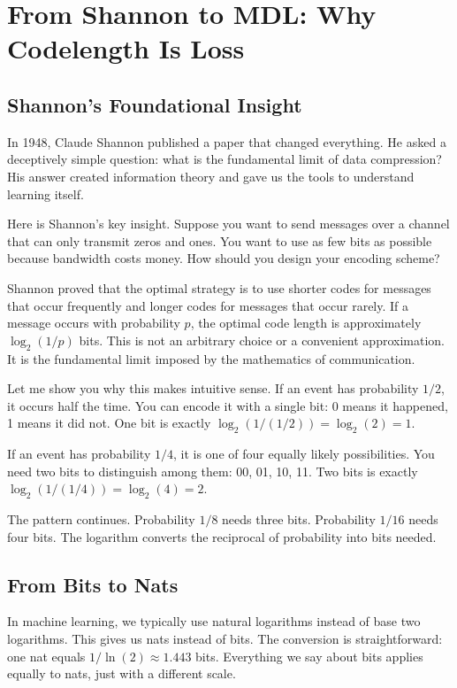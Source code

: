 \vspace{2em}

\section{From Shannon to MDL: Why Codelength Is Loss}

\subsection{Shannon's Foundational Insight}

In 1948, Claude Shannon published a paper that changed everything. He asked a deceptively simple question: what is the fundamental limit of data compression? His answer created information theory and gave us the tools to understand learning itself.

Here is Shannon's key insight. Suppose you want to send messages over a channel that can only transmit zeros and ones. You want to use as few bits as possible because bandwidth costs money. How should you design your encoding scheme?

Shannon proved that the optimal strategy is to use shorter codes for messages that occur frequently and longer codes for messages that occur rarely. If a message occurs with probability $p$, the optimal code length is approximately $\log_2(1/p)$ bits. This is not an arbitrary choice or a convenient approximation. It is the fundamental limit imposed by the mathematics of communication.

Let me show you why this makes intuitive sense. If an event has probability $1/2$, it occurs half the time. You can encode it with a single bit: 0 means it happened, 1 means it did not. One bit is exactly $\log_2(1/(1/2)) = \log_2(2) = 1$.

If an event has probability $1/4$, it is one of four equally likely possibilities. You need two bits to distinguish among them: 00, 01, 10, 11. Two bits is exactly $\log_2(1/(1/4)) = \log_2(4) = 2$.

The pattern continues. Probability $1/8$ needs three bits. Probability $1/16$ needs four bits. The logarithm converts the reciprocal of probability into bits needed.

\subsection{From Bits to Nats}

In machine learning, we typically use natural logarithms instead of base two logarithms. This gives us nats instead of bits. The conversion is straightforward: one nat equals $1/\ln(2) \approx 1.443$ bits. Everything we say about bits applies equally to nats, just with a different scale.

